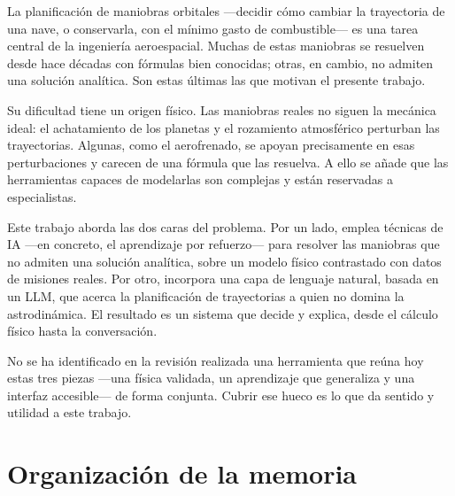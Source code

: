 La planificación de maniobras orbitales ---decidir cómo cambiar la trayectoria de una nave, o conservarla, con el mínimo gasto de combustible--- es una tarea central de la ingeniería aeroespacial. Muchas de estas maniobras se resuelven desde hace décadas con fórmulas bien conocidas; otras, en cambio, no admiten una solución analítica. Son estas últimas las que motivan el presente trabajo.

Su dificultad tiene un origen físico. Las maniobras reales no siguen la mecánica ideal: el achatamiento de los planetas y el rozamiento atmosférico perturban las trayectorias. Algunas, como el aerofrenado, se apoyan precisamente en esas perturbaciones y carecen de una fórmula que las resuelva. A ello se añade que las herramientas capaces de modelarlas son complejas y están reservadas a especialistas.

Este trabajo aborda las dos caras del problema. Por un lado, emplea técnicas de \gls{IA} ---en concreto, el aprendizaje por refuerzo--- para resolver las maniobras que no admiten una solución analítica, sobre un modelo físico contrastado con datos de misiones reales. Por otro, incorpora una capa de lenguaje natural, basada en un \gls{LLM}, que acerca la planificación de trayectorias a quien no domina la astrodinámica. El resultado es un sistema que decide y explica, desde el cálculo físico hasta la conversación.

No se ha identificado en la revisión realizada una herramienta que reúna hoy estas tres piezas ---una física validada, un aprendizaje que generaliza y una interfaz accesible--- de forma conjunta. Cubrir ese hueco es lo que da sentido y utilidad a este trabajo.

\section{Organización de la memoria}
\label{sec:intro-organizacion}

